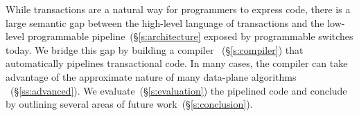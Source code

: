 While transactions are a natural way for programmers to express code, there is
a large semantic gap between the high-level language of transactions and the
low-level programmable pipeline~(\S\ref{s:architecture} exposed by programmable
switches today. We bridge this gap by building a compiler ~(\S\ref{s:compiler})
that automatically pipelines transactional code. In many cases, the compiler
can take advantage of the approximate nature of many data-plane algorithms
~(\S\ref{ss:advanced}). We evaluate~(\S\ref{s:evaluation}) the pipelined code
and conclude by outlining several areas of future work~(\S\ref{s:conclusion}).


\fi
